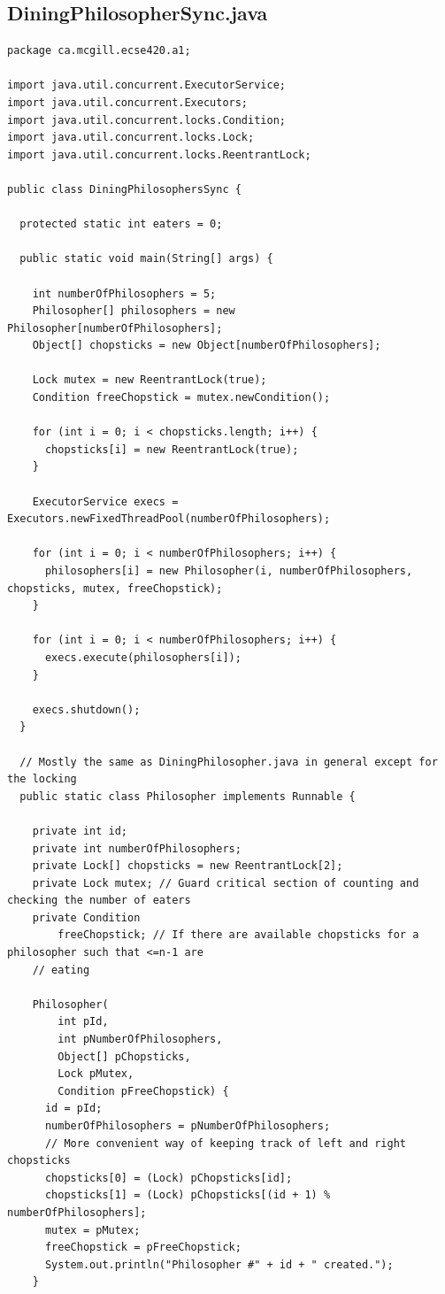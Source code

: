 \documentclass[11pt,letterpaper]{exam}
\begin{document}
\subsection*{DiningPhilosopherSync.java}
\begin{lstlisting}
package ca.mcgill.ecse420.a1;

import java.util.concurrent.ExecutorService;
import java.util.concurrent.Executors;
import java.util.concurrent.locks.Condition;
import java.util.concurrent.locks.Lock;
import java.util.concurrent.locks.ReentrantLock;

public class DiningPhilosophersSync {

  protected static int eaters = 0;

  public static void main(String[] args) {

    int numberOfPhilosophers = 5;
    Philosopher[] philosophers = new Philosopher[numberOfPhilosophers];
    Object[] chopsticks = new Object[numberOfPhilosophers];

    Lock mutex = new ReentrantLock(true);
    Condition freeChopstick = mutex.newCondition();

    for (int i = 0; i < chopsticks.length; i++) {
      chopsticks[i] = new ReentrantLock(true);
    }

    ExecutorService execs = Executors.newFixedThreadPool(numberOfPhilosophers);

    for (int i = 0; i < numberOfPhilosophers; i++) {
      philosophers[i] = new Philosopher(i, numberOfPhilosophers, chopsticks, mutex, freeChopstick);
    }

    for (int i = 0; i < numberOfPhilosophers; i++) {
      execs.execute(philosophers[i]);
    }

    execs.shutdown();
  }

  // Mostly the same as DiningPhilosopher.java in general except for the locking
  public static class Philosopher implements Runnable {

    private int id;
    private int numberOfPhilosophers;
    private Lock[] chopsticks = new ReentrantLock[2];
    private Lock mutex; // Guard critical section of counting and checking the number of eaters
    private Condition
        freeChopstick; // If there are available chopsticks for a philosopher such that <=n-1 are
    // eating

    Philosopher(
        int pId,
        int pNumberOfPhilosophers,
        Object[] pChopsticks,
        Lock pMutex,
        Condition pFreeChopstick) {
      id = pId;
      numberOfPhilosophers = pNumberOfPhilosophers;
      // More convenient way of keeping track of left and right chopsticks
      chopsticks[0] = (Lock) pChopsticks[id];
      chopsticks[1] = (Lock) pChopsticks[(id + 1) % numberOfPhilosophers];
      mutex = pMutex;
      freeChopstick = pFreeChopstick;
      System.out.println("Philosopher #" + id + " created.");
    }


\end{lstlisting}
\end{document}
